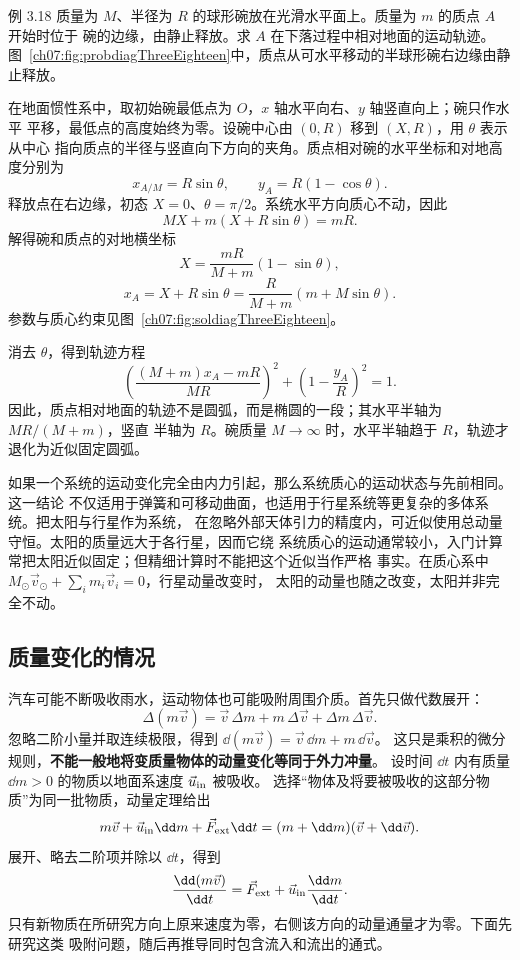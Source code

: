 \Needspace{0.36\textheight}
\begin{origexamplebox}{例 3.18}
质量为 $M$、半径为 $R$ 的球形碗放在光滑水平面上。质量为 $m$ 的质点 $A$ 开始时位于
碗的边缘，由静止释放。求 $A$ 在下落过程中相对地面的运动轨迹。
图~\ref{ch07:fig:probdiagThreeEighteen}中，质点从可水平移动的半球形碗右边缘由静止释放。
\probdiagThreeEighteen
\end{origexamplebox}

\begin{xesolution}
在地面惯性系中，取初始碗最低点为 $O$，$x$ 轴水平向右、$y$ 轴竖直向上；碗只作水平
平移，最低点的高度始终为零。设碗中心由 $(0,R)$ 移到 $(X,R)$，用 $\theta$ 表示从中心
指向质点的半径与竖直向下方向的夹角。质点相对碗的水平坐标和对地高度分别为
\[
 x_{A/M}=R\sin\theta,
 \qquad
 y_A=R(1-\cos\theta).
\]
释放点在右边缘，初态 $X=0$、$\theta=\pi/2$。系统水平方向质心不动，因此
\[
 MX+m(X+R\sin\theta)=mR.
\]
解得碗和质点的对地横坐标
\[
 X=\frac{mR}{M+m}(1-\sin\theta),
\]
\[
 x_A=X+R\sin\theta
 =\frac{R}{M+m}(m+M\sin\theta).
\]
参数与质心约束见图~\ref{ch07:fig:soldiagThreeEighteen}。

\soldiagThreeEighteen
消去 $\theta$，得到轨迹方程
\[
 \boxed{
 \left(\frac{(M+m)x_A-mR}{MR}\right)^2
 +\left(1-\frac{y_A}{R}\right)^2=1}.
\]
因此，质点相对地面的轨迹不是圆弧，而是椭圆的一段；其水平半轴为 $MR/(M+m)$，竖直
半轴为 $R$。碗质量 $M\to\infty$ 时，水平半轴趋于 $R$，轨迹才退化为近似固定圆弧。
\end{xesolution}

如果一个系统的运动变化完全由内力引起，那么系统质心的运动状态与先前相同。这一结论
不仅适用于弹簧和可移动曲面，也适用于行星系统等更复杂的多体系统。把太阳与行星作为系统，
在忽略外部天体引力的精度内，可近似使用总动量守恒。太阳的质量远大于各行星，因而它绕
系统质心的运动通常较小，入门计算常把太阳近似固定；但精细计算时不能把这个近似当作严格
事实。在质心系中 $M_\odot\vec v_\odot+\sum_i m_i\vec v_i=0$，行星动量改变时，
太阳的动量也随之改变，太阳并非完全不动。

\subsection{质量变化的情况}

汽车可能不断吸收雨水，运动物体也可能吸附周围介质。首先只做代数展开：
\begin{equation}
 \Delta(m\vec v)=\vec v\,\Delta m+m\,\Delta\vec v
 +\Delta m\,\Delta\vec v.
\end{equation}
忽略二阶小量并取连续极限，得到 $\dd(m\vec v)=\vec v\,\dd m+m\,\dd\vec v$。
这只是乘积的微分规则，\textbf{不能一般地将变质量物体的动量变化等同于外力冲量}。
设时间 $\dd t$ 内有质量 $\dd m>0$ 的物质以地面系速度 $\vec u_{\rm in}$ 被吸收。
选择“物体及将要被吸收的这部分物质”为同一批物质，动量定理给出
\[
 m\vec v+\vec u_{\rm in}\dd m+\vec F_{\rm ext}\dd t
 =(m+\dd m)(\vec v+\dd\vec v).
\]
展开、略去二阶项并除以 $\dd t$，得到
\begin{equation}\label{eq:accretion-balance}
 \frac{\dd(m\vec v)}{\dd t}
 =\vec F_{\rm ext}+\vec u_{\rm in}\frac{\dd m}{\dd t}.
\end{equation}
只有新物质在所研究方向上原来速度为零，右侧该方向的动量通量才为零。下面先研究这类
吸附问题，随后再推导同时包含流入和流出的通式。

